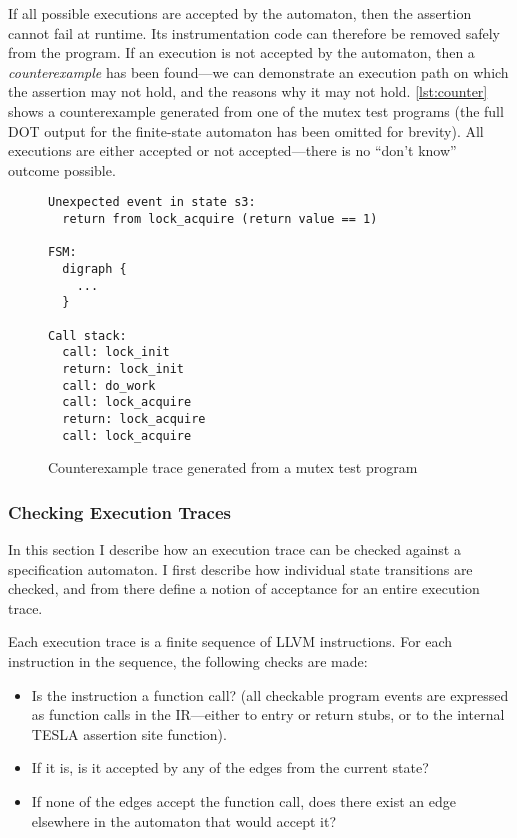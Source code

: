 If all possible executions are accepted by the automaton, then the assertion
cannot fail at runtime. Its instrumentation code can therefore be removed safely
from the program. If an execution is not accepted by the automaton, then a
\emph{counterexample} has been found---we can demonstrate an execution path on
which the assertion may not hold, and the reasons why it may not hold.
\autoref{lst:counter} shows a counterexample generated from one of the mutex
test programs (the full DOT output for the finite-state automaton has been
omitted for brevity). All executions are either accepted or not accepted---there
is no ``don't know'' outcome possible.

\begin{figure}
  \begin{verbatim}
Unexpected event in state s3:
  return from lock_acquire (return value == 1)

FSM:
  digraph {
    ...
  }

Call stack:
  call: lock_init
  return: lock_init
  call: do_work
  call: lock_acquire
  return: lock_acquire
  call: lock_acquire
  \end{verbatim}
  \caption{Counterexample trace generated from a mutex test program}
  \label{lst:counter}
\end{figure}

\subsubsection{Checking Execution Traces}

In this section I describe how an execution trace can be checked against a
specification automaton. I first describe how individual state transitions are
checked, and from there define a notion of acceptance for an entire execution
trace.

Each execution trace is a finite sequence of LLVM instructions. For each
instruction in the sequence, the following checks are made:
\begin{itemize}
  \item Is the instruction a function call? (all checkable program events are
    expressed as function calls in the IR---either to entry or return stubs, or
    to the internal TESLA assertion site function).
  \item If it is, is it accepted by any of the edges from the current state?
  \item If none of the edges accept the function call, does there exist an edge
    elsewhere in the automaton that would accept it?
\end{itemize}

